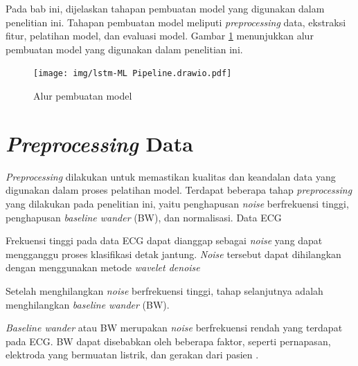 






Pada bab ini, dijelaskan tahapan pembuatan model yang digunakan dalam penelitian ini. Tahapan pembuatan model meliputi \textit{preprocessing} data, ekstraksi fitur, pelatihan model, dan evaluasi model. Gambar \ref{fig:alur-model} menunjukkan alur pembuatan model yang digunakan dalam penelitian ini.

\begin{figure}[H]
  \begin{center}
    \texttt{[image: img/lstm-ML Pipeline.drawio.pdf]}
  \end{center}
  \caption{Alur pembuatan model}
  \label{fig:alur-model}
\end{figure}

\section{\emph{Preprocessing} Data}
\label{subsec: bab4-preprocessing-data}

\textit{Preprocessing} dilakukan untuk memastikan kualitas dan keandalan data yang digunakan dalam proses pelatihan model. 
Terdapat beberapa tahap \textit{preprocessing} yang dilakukan pada penelitian ini, yaitu penghapusan \textit{noise} berfrekuensi tinggi, penghapusan \textit{baseline wander} (BW), dan normalisasi.
Data ECG 

Frekuensi tinggi pada data ECG dapat dianggap sebagai \textit{noise} yang dapat mengganggu proses klasifikasi detak jantung.
\textit{Noise} tersebut dapat dihilangkan dengan menggunakan metode \textit{wavelet denoise}

Setelah menghilangkan \textit{noise} berfrekuensi tinggi, tahap selanjutnya adalah menghilangkan \textit{baseline wander} (BW).

\textit{Baseline wander} atau BW merupakan \textit{noise} berfrekuensi rendah yang terdapat pada ECG.
BW dapat disebabkan oleh beberapa faktor, seperti pernapasan, elektroda yang bermuatan listrik, dan gerakan dari pasien \parencite{lenisComparisonBaselineWander2017}.

